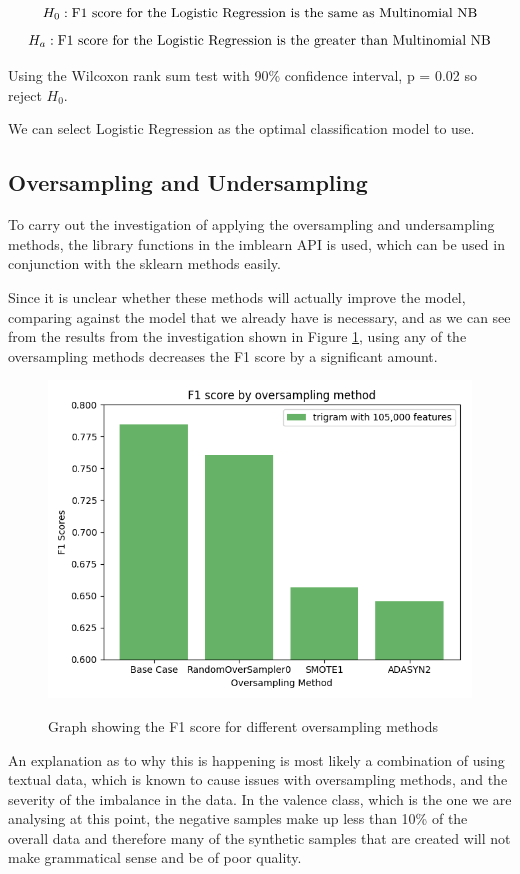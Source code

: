 $$ H_0: \textnormal{F1 score for the Logistic Regression is the same as Multinomial NB}$$
$$ H_a: \textnormal{F1 score for the Logistic Regression is the greater than Multinomial NB}$$

Using the Wilcoxon rank sum test with 90\% confidence interval, p = 0.02 so reject $H_0$.

We can select Logistic Regression as the optimal classification model to use.


\subsection{Oversampling and Undersampling}

To carry out the investigation of applying the oversampling and undersampling methods, the library functions in the imblearn API is used, which can be used in conjunction with the sklearn methods easily. 

Since it is unclear whether these methods will actually improve the model, comparing against the model that we already have is necessary, and as we can see from the results from the investigation shown in  Figure \ref{oversamplegraph}, using any of the oversampling methods decreases the F1 score by a significant amount. 

\begin{figure}[ht]
\caption{Graph showing the F1 score for different oversampling methods}
\centering
\includegraphics[scale=0.7]{graphs/oversampling.png}
\label{oversamplegraph}
\end{figure}

An explanation as to why this is happening is most likely a combination of using textual data, which is known to cause issues with oversampling methods, and the severity of the imbalance in the data. In the valence class, which is the one we are analysing at this point, the negative samples make up less than 10\% of the overall data and therefore many of the synthetic samples that are created will not make grammatical sense and be of poor quality. 


